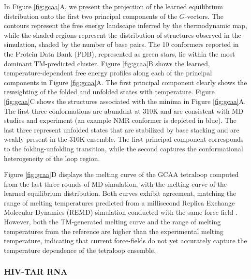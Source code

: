 \documentclass[9pt,twocolumn,twoside]{pnas-new}
\newcommand{\pt}{\color{red}}
\begin{document}
{In Figure \ref{fig:gcaa}A, we present the projection of the learned equilibrium distribution onto the first two principal components of the $G$-vectors. The contours represent the free energy landscape inferred by the thermodynamic map, while the shaded regions represent the distribution of structures observed in the simulation, shaded by the number of base pairs. The 10 conformers reported in the Protein Data Bank (PDB), represented as green stars, lie within the most dominant TM-predicted cluster. Figure \ref{fig:gcaa}B shows the learned, temperature-dependent free energy profiles along each of the principal components in Figure \ref{fig:gcaa}A. The first principal component clearly shows the reweighting of the folded and unfolded states with temperature. Figure \ref{fig:gcaa}C shows the structures associated with the minima in Figure \ref{fig:gcaa}A. The first three conformations are abundant at 310K and are consistent with MD studies \cite{DE-Shaw-RNA-ff,debenedetti-rna} and experiment (an example NMR conformer is depicted in blue). The last three represent unfolded states that are stabilized by base stacking and are weakly present in the 310K ensemble. The first principal component corresponds to the folding-unfolding transition, while the second captures the conformational heterogeneity of the loop region.



Figure \ref{fig:gcaa}D displays the melting curve of the GCAA tetraloop computed from the last three rounds of MD simulation, with the melting curve of the learned equilibrium distribution. Both curves exhibit agreement, matching the range of melting temperatures predicted from a millisecond Replica Exchange Molecular Dynamics (REMD) simulation conducted with the same force-field \cite{DE-Shaw-RNA-ff}. However, both the TM-generated melting curve and the range of melting temperatures from the reference are higher than the experimental melting temperature, indicating that current force-fields do not yet accurately capture the temperature dependence of the tetraloop ensemble.

\subsubsection{HIV-TAR RNA}

}
\end{document}
